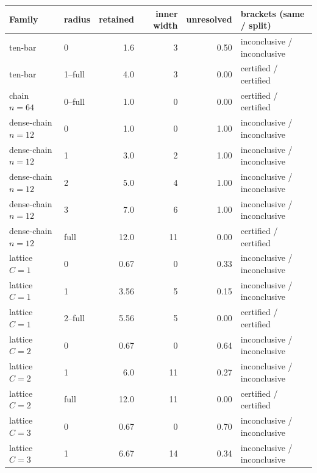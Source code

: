 \documentclass[11pt]{article}
\theoremstyle{plain}
\theoremstyle{definition}
\theoremstyle{remark}
\begin{document}
\begin{center}
\begin{tabular}{@{}llrrrl@{}}
\toprule
Family & radius & retained & inner width & unresolved & brackets (same / split)\\
\midrule
ten-bar & 0 & 1.6 & 3 & 0.50 & inconclusive / inconclusive\\
ten-bar & 1--full & 4.0 & 3 & 0.00 & certified / certified\\
chain \(n{=}64\) & 0--full & 1.0 & 0 & 0.00 & certified / certified\\
dense-chain \(n{=}12\) & 0 & 1.0 & 0 & 1.00 & inconclusive / inconclusive\\
dense-chain \(n{=}12\) & 1 & 3.0 & 2 & 1.00 & inconclusive / inconclusive\\
dense-chain \(n{=}12\) & 2 & 5.0 & 4 & 1.00 & inconclusive / inconclusive\\
dense-chain \(n{=}12\) & 3 & 7.0 & 6 & 1.00 & inconclusive / inconclusive\\
dense-chain \(n{=}12\) & full & 12.0 & 11 & 0.00 & certified / certified\\
lattice \(C{=}1\) & 0 & 0.67 & 0 & 0.33 & inconclusive / inconclusive\\
lattice \(C{=}1\) & 1 & 3.56 & 5 & 0.15 & inconclusive / inconclusive\\
lattice \(C{=}1\) & 2--full & 5.56 & 5 & 0.00 & certified / certified\\
lattice \(C{=}2\) & 0 & 0.67 & 0 & 0.64 & inconclusive / inconclusive\\
lattice \(C{=}2\) & 1 & 6.0 & 11 & 0.27 & inconclusive / inconclusive\\
lattice \(C{=}2\) & full & 12.0 & 11 & 0.00 & certified / certified\\
lattice \(C{=}3\) & 0 & 0.67 & 0 & 0.70 & inconclusive / inconclusive\\
lattice \(C{=}3\) & 1 & 6.67 & 14 & 0.34 & inconclusive / inconclusive\\
\bottomrule
\end{tabular}
\end{center}
\end{document}

